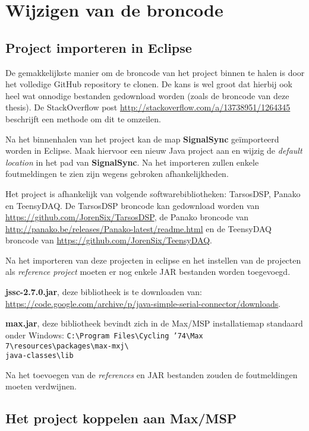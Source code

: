 \section*{Wijzigen van de broncode}

\subsection*{Project importeren in Eclipse}

De gemakkelijkste manier om de broncode van het project binnen te halen is door het volledige GitHub repository te clonen. De kans is wel groot dat hierbij ook heel wat onnodige bestanden gedownload worden (zoals de broncode van deze thesis). De StackOverflow post \url{http://stackoverflow.com/a/13738951/1264345} beschrijft een methode om dit te omzeilen. 

Na het binnenhalen van het project kan de map \textbf{SignalSync} geïmporteerd worden in Eclipse. Maak hiervoor een nieuw Java project aan en wijzig de \textit{default location} in het pad van \textbf{SignalSync}. Na het importeren zullen enkele foutmeldingen te zien zijn wegens gebroken afhankelijkheden. 

Het project is afhankelijk van volgende softwarebibliotheken: TarsosDSP, Panako en TeensyDAQ. De TarsosDSP broncode kan gedownload worden van \url{https://github.com/JorenSix/TarsosDSP}, de Panako broncode van \url{http://panako.be/releases/Panako-latest/readme.html} en de TeensyDAQ broncode van \url{https://github.com/JorenSix/TeensyDAQ}. 

Na het importeren van deze projecten in eclipse en het instellen van de projecten als \textit{reference project} moeten er nog enkele JAR bestanden worden toegevoegd. 

\textbf{jssc-2.7.0.jar}, deze bibliotheek is te downloaden van: \url{https://code.google.com/archive/p/java-simple-serial-connector/downloads}.

\textbf{max.jar}, deze bibliotheek bevindt zich in de Max/MSP installatiemap standaard onder Windows: \texttt{C:\textbackslash Program Files\textbackslash Cycling '74\textbackslash Max 7\textbackslash resources\textbackslash packages\textbackslash max-mxj\textbackslash \\ java-classes\textbackslash lib}

Na het toevoegen van de \textit{references} en JAR bestanden zouden de foutmeldingen moeten verdwijnen.

\subsection*{Het project koppelen aan Max/MSP}

